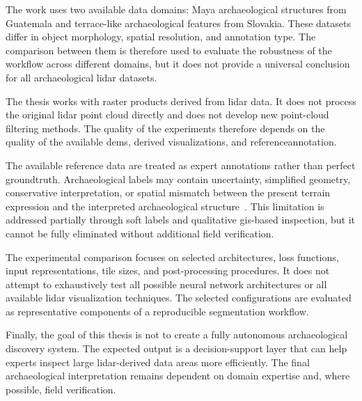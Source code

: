 The work uses two available data domains: Maya archaeological structures from Guatemala and terrace-like archaeological features from Slovakia. These datasets differ in object morphology, spatial resolution, and annotation type. The comparison between them is therefore used to evaluate the robustness of the workflow across different domains, but it does not provide a universal conclusion for all archaeological \gls{lidar} datasets.

The thesis works with raster products derived from \gls{lidar} data. It does not process the original \gls{lidar} point cloud directly and does not develop new point-cloud filtering methods. The quality of the experiments therefore depends on the quality of the available \glspl{dem}, derived visualizations, and \gls{referenceannotation}.

The available reference data are treated as expert annotations rather than perfect \gls{groundtruth}. Archaeological labels may contain uncertainty, simplified geometry, conservative interpretation, or spatial mismatch between the present terrain expression and the interpreted archaeological structure~\cite{bundzel_semantic_2020,cowley_what_2016,hutson2012unavoidable,Quintus_Day_Smith_2017}. This limitation is addressed partially through soft labels and qualitative \gls{gis}-based inspection, but it cannot be fully eliminated without additional field verification.

The experimental comparison focuses on selected architectures, loss functions, input representations, tile sizes, and post-processing procedures. It does not attempt to exhaustively test all possible neural network architectures or all available \gls{lidar} visualization techniques. The selected configurations are evaluated as representative components of a reproducible segmentation workflow.

Finally, the goal of this thesis is not to create a fully autonomous archaeological discovery system. The expected output is a decision-support layer that can help experts inspect large \gls{lidar}-derived data areas more efficiently. The final archaeological interpretation remains dependent on domain expertise and, where possible, field verification.
